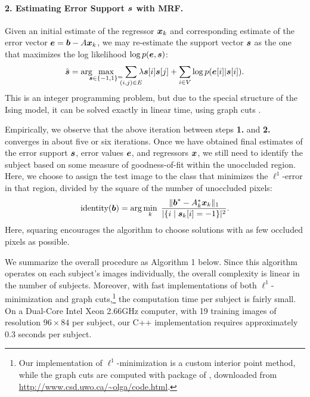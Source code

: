 \paragraph{2. Estimating Error Support $\boldsymbol{s}$ with MRF.} 
Given an initial estimate of the regressor ${\boldsymbol{x}}_k$ and corresponding estimate of the error vector $\boldsymbol{e} = \boldsymbol{b} - A {\boldsymbol{x}}_k$, we may re-estimate the support vector $\boldsymbol{s}$ as the one that maximizes the log likelihood $\log p(\boldsymbol{e},\boldsymbol{s})$:\vspace{0mm}
\begin{equation}
\hat{\s} = \arg\hspace{-2mm}\max_{\s \in \{-1,1\}^m}\hspace{-2mm} \sum_{(i,j)\in E} \hspace{-2mm} \lambda \s[i]\s[j] +
\sum_{i\in V} \log p(\e[i] | \s[i]). \vspace{0mm}
\end{equation}
This is an integer programming problem, but due to the special structure of the Ising model, it can be solved exactly in linear time, using graph cuts \cite{Kolmogorov2004-PAMI}.

\vspace{1 em}
Empirically, we observe that the above iteration between steps {\bf1.} and {\bf2.} converges in about five or six iterations. Once we have obtained final estimates of the error support $\boldsymbol{s}$, error values $\boldsymbol{e}$, and regressors ${\boldsymbol{x}}$, we still need to identify the subject based on some measure of goodness-of-fit within the unoccluded region. Here, we choose to assign the test image to the class that minimizes the $\ell^1$-error in that region, divided by the square of the number of unoccluded pixels:\vspace{0mm}
$$\text{identity}(\bb) = \arg \min_k \; \frac{\| \bb^* - A_k^* \x_k \|_1}{|\{ i \mid \s_k[i] = -1 \}|^2}. \vspace{0mm}$$
Here, squaring encourages the algorithm to choose solutions with as few occluded pixels as possible.

We summarize the overall procedure as Algorithm 1 below. Since this algorithm operates on each subject's images individually, the overall complexity is linear in the number of subjects. Moreover, with fast implementations of both $\ell^1$-minimization and graph cuts,\footnote{Our implementation of $\ell^1$-minimization is a custom interior point method, while the graph cuts are computed with package of \cite{Boykov2001-PAMI,Kolmogorov2004-PAMI,Boykov2004-PAMI}, downloaded from \url{http://www.csd.uwo.ca/~olga/code.html}.} the computation time per subject is fairly small. On a Dual-Core Intel Xeon 2.66GHz computer, with 19 training images of resolution $96 \times 84$ per subject, our C++ implementation requires approximately 0.3 seconds per subject.

